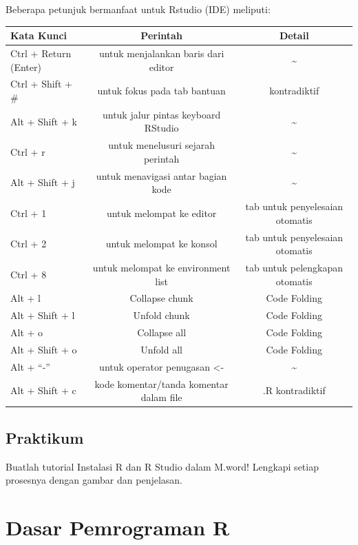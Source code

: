 \documentclass[
]{book}
\begin{document}
Beberapa petunjuk bermanfaat untuk Rstudio (IDE) meliputi:

\begin{longtable}[]{@{}lcc@{}}
\toprule\noalign{}
Kata Kunci & Perintah & Detail \\
\midrule\noalign{}
\endhead
\bottomrule\noalign{}
\endlastfoot
Ctrl + Return (Enter) & untuk menjalankan baris dari editor & \textasciitilde{} \\
Ctrl + Shift + \# & untuk fokus pada tab bantuan & kontradiktif \\
Alt + Shift + k & untuk jalur pintas keyboard RStudio & \textasciitilde{} \\
Ctrl + r & untuk menelusuri sejarah perintah & \textasciitilde{} \\
Alt + Shift + j & untuk menavigasi antar bagian kode & \textasciitilde{} \\
Ctrl + 1 & untuk melompat ke editor & tab untuk penyelesaian otomatis \\
Ctrl + 2 & untuk melompat ke konsol & tab untuk penyelesaian otomatis \\
Ctrl + 8 & untuk melompat ke environment list & tab untuk pelengkapan otomatis \\
Alt + l & Collapse chunk & Code Folding \\
Alt + Shift + l & Unfold chunk & Code Folding \\
Alt + o & Collapse all & Code Folding \\
Alt + Shift + o & Unfold all & Code Folding \\
Alt + ``-'' & untuk operator penugasan \textless- & \textasciitilde{} \\
Alt + Shift + c & kode komentar/tanda komentar dalam file & .R kontradiktif \\
\end{longtable}

\hypertarget{praktikum}{%
\section{Praktikum}\label{praktikum}}

Buatlah tutorial Instalasi R dan R Studio dalam M.word! Lengkapi setiap prosesnya dengan gambar dan penjelasan.

\hypertarget{dasar-pemrograman-r}{%
\chapter{Dasar Pemrograman R}\label{dasar-pemrograman-r}}
\end{document}
